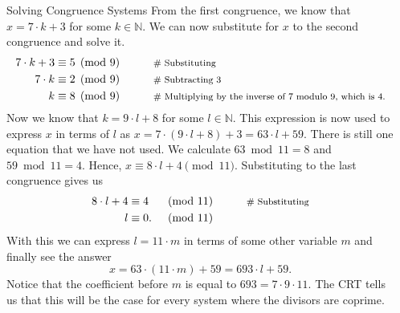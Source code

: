 \documentclass[final]{beamer}
\newlength{\sepwidth}
\newlength{\colwidth}
\newcommand{\separatorcolumn}{\begin{column}{\sepwidth}\end{column}}
\newcommand{\N}{\mathbb{N}}
\begin{document}
\begin{frame}[t]
\begin{columns}[t]
\begin{column}{\colwidth}
\begin{block}{Solving Congruence Systems}
  \alert{From the first congruence}, we know that $x= 7 \cdot k +3$ for some $k
  \in \N$. We can now substitute for $x$ to the second congruence and solve it.
\begin{equation*}
   \begin{aligned}
    7 \cdot k +3 & \equiv 5 \pmod{9}  && \qquad \text{\footnotesize{\# Substituting}} \\
    7 \cdot k &\equiv 2 \pmod{9}&& \qquad \text{\footnotesize{\# Subtracting $3$}}  \\
    k &\equiv 8 \pmod{9} &&\qquad \text{\footnotesize{\# Multiplying by the
     inverse of $7$ modulo $9$, which is $4$.}}
   \end{aligned}
  \end{equation*}
 Now we know that $k = 9 \cdot l + 8$ for some $l \in \N$. This expression is
 now used to express $x$ in terms of $l$ as $x = 7 \cdot (9 \cdot l+8)+3 = 63
 \cdot l + 59$. There is still one equation that we have not used. We calculate
 $63 \bmod 11 = 8$ and $59 \bmod 11 = 4$. Hence, $x \equiv 8 \cdot l + 4
 \pmod{11}$. Substituting to the last congruence gives us
\begin{equation*}
   \begin{aligned}
    8 \cdot l + 4 & \equiv 4 & \pmod{11}  && \qquad    \text{\footnotesize{\# Substituting}} \\
    l &\equiv 0. & \pmod{11} 
   \end{aligned}
  \end{equation*}
 With this we can express $l = 11 \cdot m$ in terms of some other variable $m$
 and finally see the answer
 \[
  x = 63 \cdot (11 \cdot m) + 59 = 693 \cdot l + 59.
 \]
 Notice that the coefficient before $m$ is equal to $693 = 7\cdot 9 \cdot 11$.
 The CRT tells us that \alert{this will be the case for every system where the
 divisors are coprime}.
 \end{block}

\end{column}
\separatorcolumn

\end{columns}
\end{frame}
\end{document}
